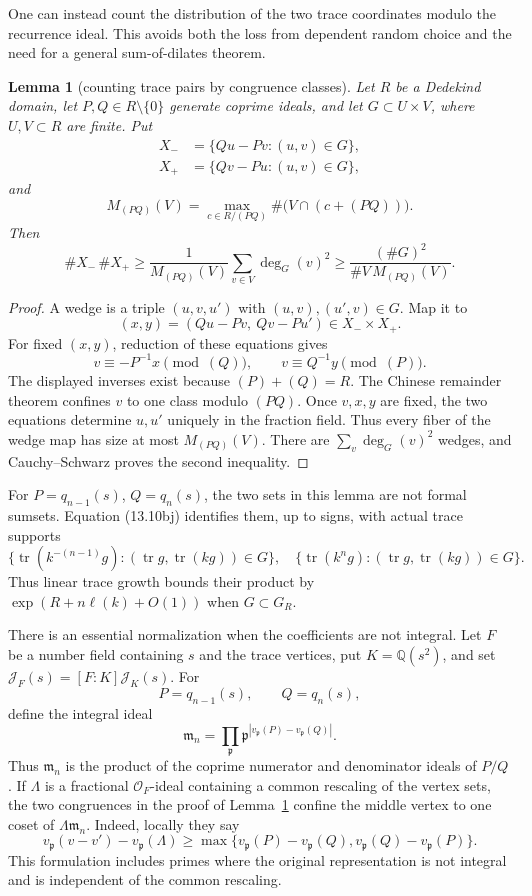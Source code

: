 \documentclass[11pt,reqno]{amsart}
\newtheorem{lemma}[theorem]{Lemma}
\theoremstyle{definition}
\theoremstyle{remark}
\newcommand{\Q}{\mathbb Q}
\newcommand{\Tr}{\operatorname{tr}}
\begin{document}
One can instead count the distribution of the two trace coordinates modulo
the recurrence ideal.  This avoids both the loss from dependent random
choice and the need for a general sum-of-dilates theorem.

\begin{lemma}[counting trace pairs by congruence classes]
\label{lem:congruence-wedge}
Let \(R\) be a Dedekind domain, let \(P,Q\in R\setminus\{0\}\) generate
coprime ideals, and let \(G\subset U\times V\), where \(U,V\subset R\)
are finite.  Put
\[
 \begin{split}
 X_-&=\{Qu-Pv:(u,v)\in G\},\\
 X_+&=\{Qv-Pu:(u,v)\in G\},
 \end{split}
\]
and
\[
 M_{(PQ)}(V)=
 \max_{c\in R/(PQ)}\#\bigl(V\cap(c+(PQ))\bigr).
\]
Then
\[
 \#X_-\,\#X_+
 \ge \frac{1}{M_{(PQ)}(V)}
       \sum_{v\in V}\deg_G(v)^2
 \ge \frac{(\#G)^2}{\#V\,M_{(PQ)}(V)}.
\tag{13.10bp0}
\]
\end{lemma}

\begin{proof}
A wedge is a triple \((u,v,u')\) with
\((u,v),(u',v)\in G\).  Map it to
\[
 (x,y)=(Qu-Pv,\ Qv-Pu')\in X_-\times X_+.
\]
For fixed \((x,y)\), reduction of these equations gives
\[
 v\equiv-P^{-1}x\pmod{(Q)},
 \qquad
 v\equiv Q^{-1}y\pmod{(P)}.
\]
The displayed inverses exist because \((P)+(Q)=R\).  The Chinese remainder
theorem confines \(v\) to one class modulo \((PQ)\).  Once \(v,x,y\) are
fixed, the two equations determine \(u,u'\) uniquely in the fraction field.
Thus every fiber of the wedge map has size at most \(M_{(PQ)}(V)\).
There are \(\sum_v\deg_G(v)^2\) wedges, and Cauchy--Schwarz proves the
second inequality.
\end{proof}

For \(P=q_{n-1}(s)\), \(Q=q_n(s)\), the two sets in this lemma are not
formal sumsets.  Equation (13.10bj) identifies them, up to signs, with
actual trace supports
\[
 \{\Tr(k^{-(n-1)}g):(\Tr g,\Tr(kg))\in G\},
 \quad
 \{\Tr(k^ng):(\Tr g,\Tr(kg))\in G\}.
\tag{13.10bp1}
\]
Thus linear trace growth bounds their product by
\(\exp(R+n\ell(k)+O(1))\) when \(G\subset G_R\).

There is an essential normalization when the coefficients are not integral.
Let \(F\) be a number field containing \(s\) and the trace vertices, put
\(K=\Q(s^2)\), and set
\(\mathcal J_F(s)=[F:K]\mathcal J_K(s)\).  For
\[
 P=q_{n-1}(s),\qquad Q=q_n(s),
\]
define the integral ideal
\[
 \mathfrak m_n=
 \prod_{\mathfrak p}
 \mathfrak p^{|v_{\mathfrak p}(P)-v_{\mathfrak p}(Q)|}.
\tag{13.10bp2}
\]
Thus \(\mathfrak m_n\) is the product of the coprime numerator and
denominator ideals of \(P/Q\).  If \(\Lambda\) is a fractional
\(\mathcal O_F\)-ideal containing a common rescaling of the vertex sets,
the two congruences in the proof of Lemma~\ref{lem:congruence-wedge}
confine the middle vertex to one coset of \(\Lambda\mathfrak m_n\).
Indeed, locally they say
\[
 v_{\mathfrak p}(v-v')-v_{\mathfrak p}(\Lambda)
 \ge
 \max\{v_{\mathfrak p}(P)-v_{\mathfrak p}(Q),
       v_{\mathfrak p}(Q)-v_{\mathfrak p}(P)\}.
\]
This formulation includes primes where the original representation is not
integral and is independent of the common rescaling.
\end{document}
